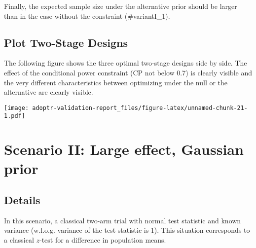 \documentclass[]{book}
\newenvironment{Shaded}{\begin{snugshade}}{\end{snugshade}}
\newcommand{\DecValTok}[1]{\textcolor[rgb]{0.00,0.00,0.81}{#1}}
\newcommand{\KeywordTok}[1]{\textcolor[rgb]{0.13,0.29,0.53}{\textbf{#1}}}
\newcommand{\NormalTok}[1]{#1}
\newcommand{\OperatorTok}[1]{\textcolor[rgb]{0.81,0.36,0.00}{\textbf{#1}}}
\newcommand{\StringTok}[1]{\textcolor[rgb]{0.31,0.60,0.02}{#1}}
\begin{document}
Finally, the expected sample size under the alternative prior should
be larger than in the case without the constraint (\#variantI\_1).

\begin{Shaded}
\end{Shaded}

\hypertarget{plot-two-stage-designs}{%
\section{Plot Two-Stage Designs}\label{plot-two-stage-designs}}

The following figure shows the three optimal two-stage designs side by
side.
The effect of the conditional power constraint (CP not below 0.7) is
clearly visible and the very different characteristics between
optimizing under the null or the alternative are clearly visible.

\texttt{[image: adoptr-validation-report\_files/figure-latex/unnamed-chunk-21-1.pdf]}

\hypertarget{scenarioII}{%
\chapter{Scenario II: Large effect, Gaussian prior}\label{scenarioII}}

\hypertarget{details-1}{%
\section{Details}\label{details-1}}

In this scenario, a classical two-arm trial with normal
test statistic and known variance (w.l.o.g. variance of
the test statistic is 1).
This situation corresponds to a classical \(z\)-test for
a difference in population means.
\end{document}
